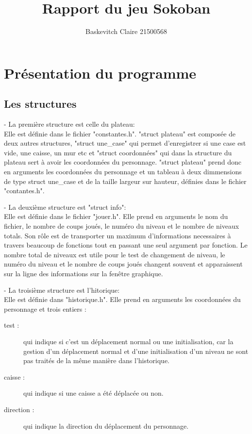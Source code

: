 \documentclass{report}
\title{\textbf{\huge Rapport du jeu Sokoban}}
\author{Baskevitch Claire 21500568}
\begin{document}
\maketitle


\part{Présentation du programme}
	\chapter{Les structures}
- La première structure est celle du plateau:\\
Elle est définie dans le fichier "constantes.h".
"struct plateau" est composée de deux autres structures, "struct une\_case" qui permet d'enregistrer si une case est vide, une caisse, un mur etc et "struct coordonnées" qui dans la structure du plateau sert à avoir les coordonnées du personnage.
"struct plateau" prend donc en arguments les coordonnées du personnage et un tableau à deux dimmensions de type struct une\_case et de la taille largeur sur hauteur, définies dans le fichier "contantes.h".

- La deuxième structure est "struct info":\\
Elle est définie dans le fichier "jouer.h".
Elle prend en arguments le nom du fichier, le nombre de coups joués, le numéro du niveau et le nombre de niveaux totals. Son rôle est de transporter un maximum d'informations necessaires à travers beaucoup de fonctions tout en passant une seul argument par fonction. Le nombre total de niveaux est utile pour le test de changement de niveau, le numéro du niveau et le nombre de coups joués changent souvent et apparaissent sur la ligne des informations sur la fenêtre graphique.

- La troisième structure est l'hitorique:\\
Elle est définie dans "historique.h".
Elle prend en arguments les coordonnées du personnage et trois entiers :
\begin{description}
\item[test :]qui indique si c'est un déplacement normal ou une initialisation, car la gestion d'un déplacement normal et d'une initialisation d'un niveau ne sont pas traités de la même manière dans l'historique.
\item[caisse :]qui indique si une caisse a été déplacée ou non.
\item[direction :]qui indique la direction du déplacement du personnage.
\end{description}
\end{document}
